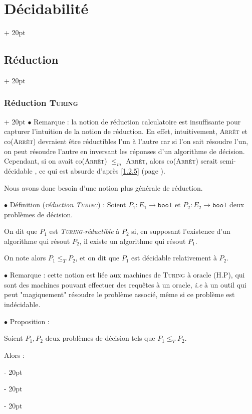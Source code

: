 \documentclass[a4paper, 12pt, twoside]{article}
\renewcommand{\le}{\leqslant}
\newcommand{\ind}[1][20pt]{\advance\leftskip + #1}
\newcommand{\deind}[1][20pt]{\advance\leftskip - #1}
\newenvironment{indt}[2][20pt]{#2 \par \ind[#1]}{\par \deind} %
\begin{document}
\begin{indt}{\section{Décidabilité}}
\begin{indt}{\subsection{Réduction}}
            \begin{indt}{\subsubsection{Réduction \textsc{Turing}}}
                $\bullet$ Remarque : la notion de réduction calculatoire est insuffisante pour capturer l'intuition de la notion de réduction. En effet, intuitivement, \textsc{Arrêt} et co(\textsc{Arrêt}) devraient être réductibles l'un à l'autre car si l'on sait résoudre l'un, on peut résoudre l'autre en inversant les réponses d'un algorithme de décision.
                Cependant, si on avait co(\textsc{Arrêt}) $\le_m$ \textsc{Arrêt}, alors co(\textsc{Arrêt}) serait semi-décidable , ce qui est absurde d'après \ref{1.2.5} (page \pageref{1.2.5}).

                Nous avons donc besoin d'une notion plus générale de réduction.

                \vspace{12pt}
                
                $\bullet$ Définition (\emph{réduction \textsc{Turing}}) :
                Soient $P_1 : E_1 \longrightarrow \mathtt{bool}$ et $P_2 : E_2 \longrightarrow \mathtt{bool}$ deux problèmes de décision.

                On dit que $P_1$ est \emph{\textsc{Turing}-réductible} à $P_2$ si, en supposant l'existence d'un algorithme qui résout $P_2$, il existe un algorithme qui résout $P_1$.

                On note alors $P_1 \le_T P_2$, et on dit que $P_1$ est décidable relativement à $P_2$.

                \vspace{12pt}
                
                $\bullet$ Remarque : cette notion est liée aux machines de \textsc{Turing} à oracle (H.P), qui sont des machines pouvant effectuer des requêtes à un oracle, \textit{i.e} à un outil qui peut "magiquement" résoudre le problème associé, même si ce problème est indécidable.

                \vspace{12pt}
                
                $\bullet$ Proposition :
                \begin{emphBox}
                    Soient $P_1, P_2$ deux problèmes de décision tels que $P_1 \le_T P_2$.

                    Alors :


\end{emphBox}
\end{indt}
\end{indt}
\end{indt}
\end{document}
